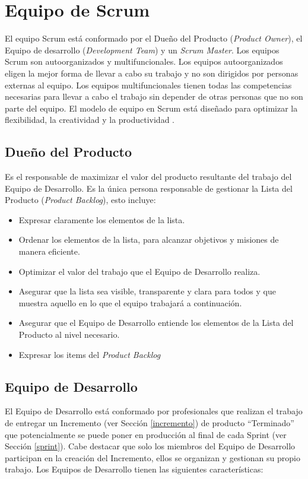 \section{Equipo de Scrum}

El equipo Scrum está conformado por el Dueño del Producto (\textit{Product Owner}), el Equipo de desarrollo (\textit{Development Team}) y un \textit{Scrum Master}. Los equipos Scrum son autoorganizados y multifuncionales. Los equipos autoorganizados eligen la mejor forma de llevar a cabo su trabajo y no son dirigidos por personas externas al equipo. Los equipos multifuncionales tienen todas las competencias necesarias para llevar a cabo el trabajo sin depender de otras personas que no son parte del equipo. El modelo de equipo en Scrum está diseñado para optimizar la flexibilidad, la creatividad y la productividad \cite{scrumSchwaber}.

\subsection{Dueño del Producto} \label{productOwner}
Es el responsable de maximizar el valor del producto resultante del trabajo del Equipo de Desarrollo. Es la única persona responsable de gestionar la Lista del Producto (\textit{Product Backlog}), esto incluye:
\begin{itemize}
\item Expresar claramente los elementos de la lista.
\item Ordenar los elementos de la lista, para alcanzar objetivos y misiones de manera eficiente.
	\item Optimizar el valor del trabajo que el Equipo de Desarrollo realiza.
	\item Asegurar que la lista sea visible, transparente y clara para todos y que muestra aquello en lo que el equipo trabajará a continuación.
	\item Asegurar que el Equipo de Desarrollo entiende los elementos de la Lista del Producto al nivel necesario.
\end{itemize}

\begin{itemize}
    \item Expresar los items del \emph{Product Backlog}
\end{itemize}

\subsection{Equipo de Desarrollo}
El Equipo de Desarrollo está conformado por profesionales que realizan el trabajo de entregar un Incremento (ver Sección \ref{incremento}) de producto “Terminado” que potencialmente se puede poner en producción al final de cada Sprint (ver Sección \ref{sprint}). Cabe destacar que solo los miembros del Equipo de Desarrollo participan en la creación del Incremento, ellos se organizan y gestionan su propio trabajo. Los Equipos de Desarrollo tienen las siguientes características: 

